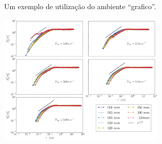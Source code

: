 	\begin{grafico}[ht]
		\caption{\label{exepretex3}Um exemplo de utilização do ambiente ``grafico''.}
		\centering
		\includegraphics[width=0.6\textwidth]{figuras/estrutura_com.pdf}
	\end{grafico}
	
	
	
	